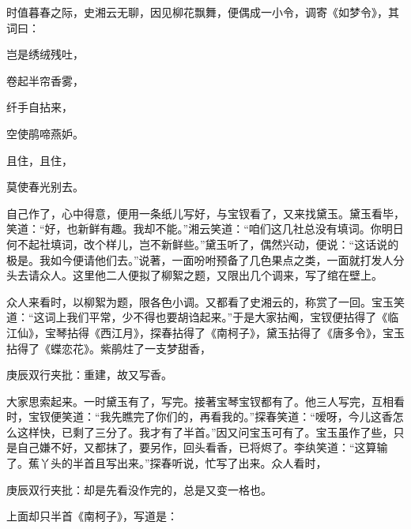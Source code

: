 \begin{parag}


    时值暮春之际，史湘云无聊，因见柳花飘舞，便偶成一小令，调寄《如梦令》，其词曰：
\end{parag}
\begin{poem}

    \begin{pl}

        岂是绣绒残吐，
    \end{pl}
    \begin{pl}

        卷起半帘香雾，
    \end{pl}
    \begin{pl}

        纤手自拈来，
    \end{pl}
    \begin{pl}

        空使鹃啼燕妒。
    \end{pl}
    \begin{pl}

        且住，且住，
    \end{pl}
    \begin{pl}

        莫使春光别去。
    \end{pl}

\end{poem}
\begin{parag}

    自己作了，心中得意，便用一条纸儿写好，与宝钗看了，又来找黛玉。黛玉看毕，笑道：“好，也新鲜有趣。我却不能。”湘云笑道：“咱们这几社总没有填词。你明日何不起社填词，改个样儿，岂不新鲜些。”黛玉听了，偶然兴动，便说：“这话说的极是。我如今便请他们去。”说著，一面吩咐预备了几色果点之类，一面就打发人分头去请众人。这里他二人便拟了柳絮之题，又限出几个调来，写了绾在壁上。
\end{parag}


\begin{parag}


    众人来看时，以柳絮为题，限各色小调。又都看了史湘云的，称赏了一回。宝玉笑道：“这词上我们平常，少不得也要胡诌起来。”于是大家拈阄，宝钗便拈得了《临江仙》，宝琴拈得《西江月》，探春拈得了《南柯子》，黛玉拈得了《唐多令》，宝玉拈得了《蝶恋花》。紫鹃炷了一支梦甜香，\begin{note}庚辰双行夹批：重建，故又写香。\end{note}大家思索起来。一时黛玉有了，写完。接著宝琴宝钗都有了。他三人写完，互相看时，宝钗便笑道：“我先瞧完了你们的，再看我的。”探春笑道：“嗳呀，今儿这香怎么这样快，已剩了三分了。我才有了半首。”因又问宝玉可有了。宝玉虽作了些，只是自己嫌不好，又都抹了，要另作，回头看香，已将烬了。李纨笑道：“这算输了。蕉丫头的半首且写出来。”探春听说，忙写了出来。众人看时，\begin{note}庚辰双行夹批：却是先看没作完的，总是又变一格也。\end{note}上面却只半首《南柯子》，写道是：
\end{parag}

